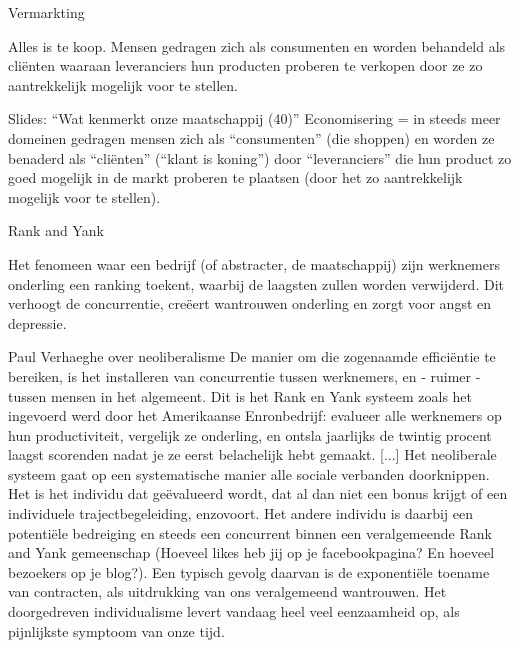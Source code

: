 \documentclass[main.tex]{subfiles}
\begin{document}
\begin{examenvraag}
    \begin{vraag}
        Vermarkting
    \end{vraag}

    \begin{antwoord}
    	Alles is te koop.‭
	‬Mensen gedragen zich als consumenten en worden behandeld als cliënten waaraan leveranciers hun producten proberen te verkopen door ze zo aantrekkelijk mogelijk voor te stellen.
        \begin{citaat}{Slides: ``Wat kenmerkt onze maatschappij (40)''}
            Economisering = in steeds meer domeinen gedragen mensen zich als “consumenten” (die shoppen) en worden ze benaderd als “cliënten” (“klant is koning”) door “leveranciers” die hun product zo goed mogelijk in de markt proberen te plaatsen (door het zo aantrekkelijk mogelijk voor te stellen).
        \end{citaat}
    \end{antwoord}
\end{examenvraag}

\begin{examenvraag}
    \begin{vraag}
        Rank and Yank
    \end{vraag}

    \begin{antwoord}
        Het fenomeen waar een bedrijf (of abstracter, de maatschappij) zijn werknemers onderling een ranking toekent, waarbij de laagsten zullen worden verwijderd.
        Dit verhoogt de concurrentie, cre\"eert wantrouwen onderling en zorgt voor angst en depressie.
        \begin{citaat}{Paul Verhaeghe over neoliberalisme}
            De manier om die zogenaamde effici\"entie te bereiken, is het installeren van concurrentie tussen werknemers, en - ruimer - tussen mensen in het algemeent.
            Dit is het Rank en Yank systeem zoals het ingevoerd werd door het Amerikaanse Enronbedrijf: evalueer alle werknemers op hun productiviteit, vergelijk ze onderling, en ontsla jaarlijks de twintig procent laagst scorenden nadat je ze eerst belachelijk hebt gemaakt.
            [...]
            Het neoliberale systeem gaat op een systematische manier alle sociale verbanden doorknippen.
            Het is het individu dat ge\"evalueerd wordt,  dat  al  dan  niet  een  bonus  krijgt  of  een  individuele  trajectbegeleiding,  enzovoort.
            Het  andere individu is daarbij een potentiële bedreiging en steeds een concurrent binnen een veralgemeende Rank and Yank gemeenschap (Hoeveel likes heb jij op je facebookpagina? En hoeveel bezoekers op je blog?).
            Een typisch gevolg daarvan is de exponenti\"ele toename van contracten, als uitdrukking van ons veralgemeend wantrouwen. Het doorgedreven individualisme levert vandaag heel veel eenzaamheid op, als pijnlijkste symptoom van onze tijd.
        \end{citaat}
    \end{antwoord}
\end{examenvraag}
\end{document}
